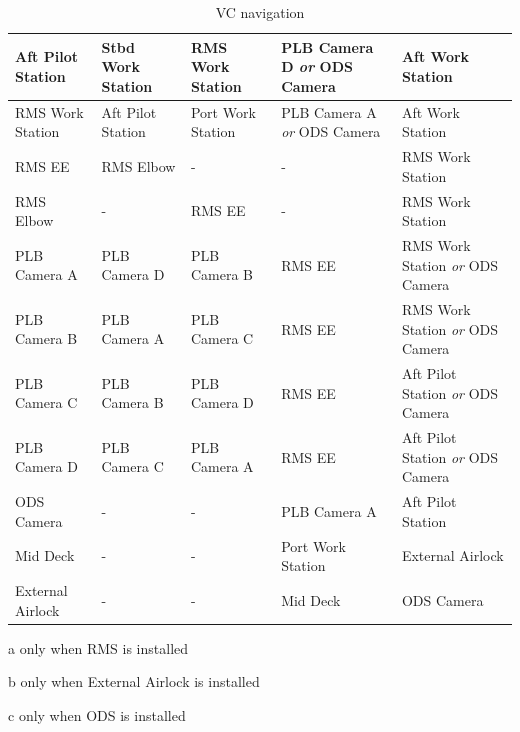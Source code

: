 \documentclass[13pt]{article}
\begin{document}
\begin{table}[H]
\begin{threeparttable}
\begin{tabular}{l|p{2.88cm} p{2.88cm} p{2.88cm} p{2.88cm} }
	\hline\rule{0pt}{2ex}
	Aft Pilot Station & Stbd Work Station & RMS Work Station & PLB Camera D \textit{or} ODS Camera\tnote{c} & Aft Work Station\\
	\hline\rule{0pt}{2ex}
	RMS Work Station & Aft Pilot Station & Port Work Station & PLB Camera A \textit{or} ODS Camera\tnote{c} & Aft Work Station\\
	\hline\rule{0pt}{2ex}
	RMS EE\tnote{a} & RMS Elbow & - & - & RMS Work Station\\
	\hline\rule{0pt}{2ex}
	RMS Elbow\tnote{a} & - & RMS EE & - & RMS Work Station\\
	\hline\rule{0pt}{2ex}
	PLB Camera A & PLB Camera D & PLB Camera B & RMS EE\tnote{a,c} & RMS Work Station \textit{or} ODS Camera\tnote{c}\\
	\hline\rule{0pt}{2ex}
	PLB Camera B & PLB Camera A & PLB Camera C & RMS EE\tnote{a,c} & RMS Work Station \textit{or} ODS Camera\tnote{c}\\
	\hline\rule{0pt}{2ex}
	PLB Camera C & PLB Camera B & PLB Camera D & RMS EE\tnote{a,c} & Aft Pilot Station \textit{or} ODS Camera\tnote{c}\\
	\hline\rule{0pt}{2ex}
	PLB Camera D & PLB Camera C & PLB Camera A & RMS EE\tnote{a,c} & Aft Pilot Station \textit{or} ODS Camera\tnote{c}\\
	\hline\rule{0pt}{2ex}
	ODS Camera\tnote{c} & - & - & PLB Camera A & Aft Pilot Station\\
	\hline\rule{0pt}{2ex}
	Mid Deck & - & - & Port Work Station & External Airlock\tnote{b}\\
	\hline\rule{0pt}{2ex}
	External Airlock\tnote{b} & - & - & Mid Deck & ODS Camera\tnote{c}\\
  \end{tabular}
	\begin{tablenotes}
		\item[a] only when RMS is installed
		\item[b] only when External Airlock is installed
		\item[c] only when ODS is installed
	\end{tablenotes}
	\end{threeparttable}
  \caption{VC navigation}
  \label{tab:VC_navigation}
\end{table}
\newpage
\end{document}
